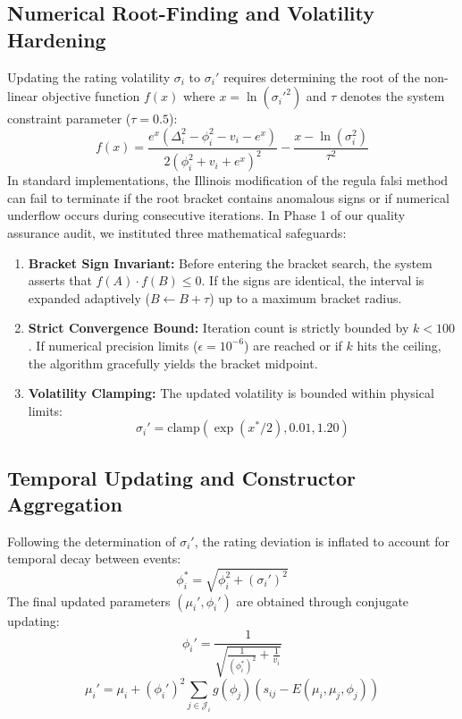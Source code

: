 \subsection{Numerical Root-Finding and Volatility Hardening}
Updating the rating volatility $\sigma_i$ to $\sigma_i'$ requires determining the root of the non-linear objective function $f(x)$ where $x = \ln(\sigma_i'^2)$ and $\tau$ denotes the system constraint parameter ($\tau = 0.5$):
\begin{equation}
f(x) = \frac{e^x (\Delta_i^2 - \phi_i^2 - v_i - e^x)}{2(\phi_i^2 + v_i + e^x)^2} - \frac{x - \ln(\sigma_i^2)}{\tau^2}
\label{eq:volatility_objective}
\end{equation}
In standard implementations, the Illinois modification of the regula falsi method can fail to terminate if the root bracket contains anomalous signs or if numerical underflow occurs during consecutive iterations. In Phase 1 of our quality assurance audit, we instituted three mathematical safeguards:
\begin{enumerate}
    \item \textbf{Bracket Sign Invariant:} Before entering the bracket search, the system asserts that $f(A) \cdot f(B) \le 0$. If the signs are identical, the interval is expanded adaptively ($B \leftarrow B + \tau$) up to a maximum bracket radius.
    \item \textbf{Strict Convergence Bound:} Iteration count is strictly bounded by $k < 100$. If numerical precision limits ($\epsilon = 10^{-6}$) are reached or if $k$ hits the ceiling, the algorithm gracefully yields the bracket midpoint.
    \item \textbf{Volatility Clamping:} The updated volatility is bounded within physical limits:
    \begin{equation}
    \sigma_i' = \text{clamp}\left( \exp(x^* / 2), 0.01, 1.20 \right)
    \end{equation}
\end{enumerate}

\subsection{Temporal Updating and Constructor Aggregation}
Following the determination of $\sigma_i'$, the rating deviation is inflated to account for temporal decay between events:
\begin{equation}
\phi_i^* = \sqrt{\phi_i^2 + (\sigma_i')^2}
\label{eq:phi_star}
\end{equation}
The final updated parameters $(\mu_i', \phi_i')$ are obtained through conjugate updating:
\begin{equation}
\phi_i' = \frac{1}{\sqrt{\frac{1}{(\phi_i^*)^2} + \frac{1}{v_i}}}
\label{eq:phi_new}
\end{equation}
\begin{equation}
\mu_i' = \mu_i + (\phi_i')^2 \sum_{j \in \mathcal{J}_i} g(\phi_j) \left( s_{ij} - E(\mu_i, \mu_j, \phi_j) \right)
\label{eq:mu_new}
\end{equation}

